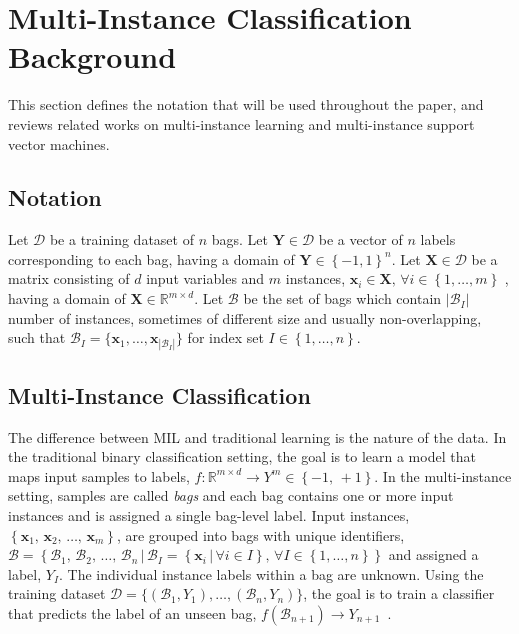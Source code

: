 \documentclass[reqno]{vcuthesis}
\newcommand{\set}[1]{{\left\{#1\right\}}}
\newcommand{\st}{{\,|\,}}
\newcommand{\reals}{{\mathbb{R}}}
\numberwithin{equation}{chapter}
\begin{document}
\section{Multi-Instance Classification Background}\label{sec:mibackground}
This section defines the notation that will be used throughout the paper, and reviews related works on multi-instance learning and multi-instance support vector machines.

\subsection{Notation}\label{subsec:minotation}
Let $\mathcal{D}$ be a training dataset of $n$ bags. Let $\bm{Y} \in \mathcal{D}$ be a vector of $n$ labels corresponding to each bag, having a domain of $\bm{Y} \in \set{-1,1}^n$. Let $\bm{X} \in \mathcal{D}$ be a matrix consisting of $d$ input variables and $m$ instances, $\bm x_i \in \bm X,\, \forall i \in \set{1,\ldots,m}$ , having a domain of $\bm{X} \in \mathbb{R}^{m \times d}$. Let $\mathcal{B}$ be the set of bags which contain $|\mathcal{B}_I|$ number of instances, sometimes of different size and usually non-overlapping, such that $\mathcal{B}_I = \{\bm x_{1}, \ldots, \bm x_{|\mathcal{B}_I|}\}$ for index set $I \in \set{1,\ldots,n}$. 

\subsection{Multi-Instance Classification}
The difference between MIL and traditional learning is the nature of the data. In the traditional binary classification setting, the goal is to learn a model that maps input samples to labels, $f: \reals^{m \times d} \rightarrow Y^m \in \set{-1,\,+1}$. In the multi-instance setting, samples are called \textit{bags} and each bag contains one or more input instances and is assigned a single bag-level label. Input instances, $\set{\bm x_1,\, \bm x_2,\, \ldots,\, \bm x_m}$, are grouped into bags with unique identifiers, $\mathcal{B} = \set{\mathcal{B}_1,\, \mathcal{B}_2,\, \ldots,\, \mathcal{B}_n \st \mathcal{B}_I = \set{\bm x_i \st \forall i \in I},\, \forall I \in \set{1, \ldots, n}}$ and assigned a label, $Y_I$. The individual instance labels within a bag are unknown. Using the training dataset $\mathcal{D} = \{(\mathcal{B}_1,Y_1), \ldots, (\mathcal{B}_n,Y_n)\}$, the goal is to train a classifier that predicts the label of an unseen bag, $f(\mathcal{B}_{n+1}) \rightarrow Y_{n+1}$~\cite{Amores2013}. 
\end{document}
